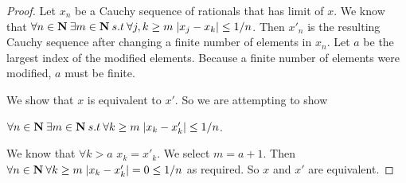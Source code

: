 \documentclass[11pt]{article}
\begin{document}
\begin{proof}

Let $x_n$ be a Cauchy sequence of rationals that has limit of $x$. We know that $\forall n \in \mathbf{N} \: \exists m \in \mathbf{N} \: s.t \: \forall j,k \geq m \; |x_j - x_k| \leq 1/n$. Then $x'_n$ is the resulting Cauchy sequence after changing a finite number of elements in $x_n$. Let $a$ be the largest index of the modified elements. Because a finite number of elements were modified, $a$ must be finite.

We show that $x $ is equivalent to $x'$. So we are attempting to show 

$\forall n \in \mathbf{N} \: \exists m \in \mathbf{N} \: s.t \: \forall k \geq m \; |x_k - x'_k| \leq 1/n$. 

We know that $\forall  k > a$ $x_k = x'_k$. We select $m = a + 1$. Then 
$\forall n \in \mathbf{N} \: \forall k \geq m \; |x_k - x'_k| = 0 \leq 1/n$ as required. So $x$ and $x'$ are equivalent.

\end{proof}
\end{document}
